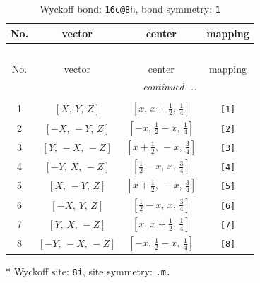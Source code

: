 \documentclass[fleqn,8pt]{jsarticle}
\begin{document}
\renewcommand{\arraystretch}{1.2}
\begin{longtable}{cccc}
\caption{Wyckoff bond: {\tt 16c@8h}, bond symmetry: {\tt 1}}
 \\
 \hline \hline
No. & vector & center & mapping \\ \hline \endfirsthead

\multicolumn{3}{l}{\tablename\ \thetable{}} \\
 \hline \hline
No. & vector & center & mapping \\ \hline \endhead

 \hline \hline
\multicolumn{3}{r}{\footnotesize\it continued ...} \\ \endfoot

 \hline \hline
\multicolumn{3}{r}{} \\ \endlastfoot

1 & $\left[ X,\, Y,\, Z \right]$ & $\left[ x,\, x + \frac{1}{2},\, \frac{1}{4} \right]$ & {\tt [1]} \\ \hline
2 & $\left[ - X,\, - Y,\, Z \right]$ & $\left[ - x,\, \frac{1}{2} - x,\, \frac{1}{4} \right]$ & {\tt [2]} \\ \hline
3 & $\left[ Y,\, - X,\, - Z \right]$ & $\left[ x + \frac{1}{2},\, - x,\, \frac{3}{4} \right]$ & {\tt [3]} \\ \hline
4 & $\left[ - Y,\, X,\, - Z \right]$ & $\left[ \frac{1}{2} - x,\, x,\, \frac{3}{4} \right]$ & {\tt [4]} \\ \hline
5 & $\left[ X,\, - Y,\, Z \right]$ & $\left[ x + \frac{1}{2},\, - x,\, \frac{3}{4} \right]$ & {\tt [5]} \\ \hline
6 & $\left[ - X,\, Y,\, Z \right]$ & $\left[ \frac{1}{2} - x,\, x,\, \frac{3}{4} \right]$ & {\tt [6]} \\ \hline
7 & $\left[ Y,\, X,\, - Z \right]$ & $\left[ x,\, x + \frac{1}{2},\, \frac{1}{4} \right]$ & {\tt [7]} \\ \hline
8 & $\left[ - Y,\, - X,\, - Z \right]$ & $\left[ - x,\, \frac{1}{2} - x,\, \frac{1}{4} \right]$ & {\tt [8]} \\
\end{longtable}
* Wyckoff site: {\tt 8i}, site symmetry: {\tt .m.}
\renewcommand{\arraystretch}{1.2}
\end{document}
